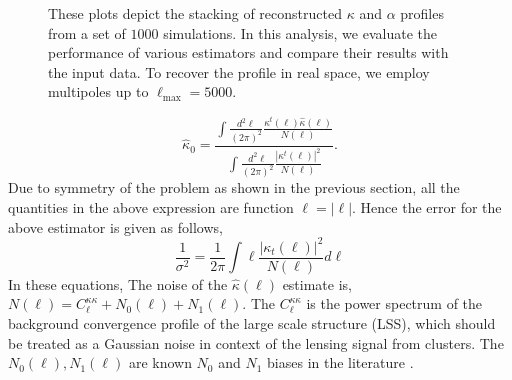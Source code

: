 \documentclass[prd, superscriptaddress, tightenlines, longbibliography, nofootinbib, eqsecnum, amsfonts, amsmath, floatfix, twocolumn, notitlepage]{revtex4-2}
\newcommand{\vecell}{ {\boldsymbol  \ell}}
\newcommand{\bs}[1]{\boldsymbol{#1}}
\begin{document}
\begin{figure}
\caption{These plots depict the stacking of reconstructed $\kappa$ and $\alpha$ profiles from a set of $1000$ simulations. In this analysis, we evaluate the performance of various estimators and compare their results with the input data. To recover the profile in real space, we employ multipoles up to $\ell_{\text{max}} = 5000$.}
\label{fig:Bias_sup}
\end{figure}

\begin{equation}\label{eq:kappa_0}
    \hat{\kappa}_0 = \frac{\int \frac{d^2\vecell}{(2\pi)^2}  \frac{\kappa^t(\vecell) \hat \kappa(\vecell)}{N(\vecell)}}{\int\frac{d^2\vecell}{(2\pi)^2}  \frac{|\kappa^t(\vecell)|^2}{N(\vecell)}}.
\end{equation}
Due to symmetry of the problem as shown in the previous section, all the quantities in the above expression are function $\ell = |\bs\ell|$. Hence the error for the above estimator is given as follows,
\begin{equation}\label{eq:kappa_0_noise}
    \frac{1}{\sigma^2} = \frac{1}{2\pi}\int \ell \frac{|\kappa_t(\ell)|^2}{N(\ell)} d\ell
\end{equation}
In these equations, The noise of the $\hat \kappa(\ell)$ estimate is, $N(\ell) = C_\ell^{\kappa\kappa} + N_0(\ell) + N_1 (\ell)$. The $C_\ell^{\kappa\kappa}$ is the power spectrum of the background convergence profile of the large scale structure (LSS), which should be treated as a Gaussian noise in context of the lensing signal from clusters. The $N_0 (\ell), N_1(\ell)$ are known $N_0$ and $N_1$ biases in the literature \cite{Kesden:2003cc,Lewis:2006fu}.
\end{document}
